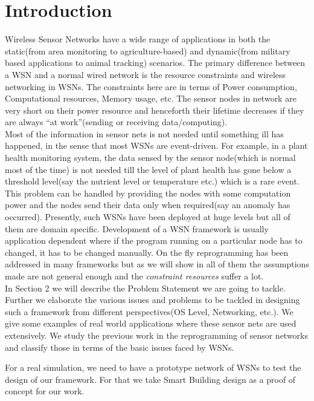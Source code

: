\documentclass[twocolumn]{article}
\begin{document}
\section{Introduction}
Wireless Sensor Networks have a wide range of applications in both the static(from area monitoring to agriculture-based) and dynamic(from military based applications to animal tracking) scenarios. The primary difference between a WSN and a normal wired network is the resource constraints and wireless networking in WSNs. The constraints here are in terms of Power consumption, Computational resources, Memory usage, etc. The sensor nodes in network are very short on their power resource and henceforth their lifetime decreases if they are always ``at work''(sending or receiving data/computing).\\
Most of the information in sensor nets is not needed until something ill has happened, in the sense that most WSNs are event-driven. For example, in a plant health monitoring system, the data sensed by the sensor node(which is normal most of the time) is not needed till the level of plant health has gone below a threshold level(say the nutrient level or temperature etc.) which is a rare event. This problem can be handled by providing the nodes with some computation power and the nodes send their data only when required(say an anomaly has occurred).
Presently, such WSNs have been deployed at huge levels but all of them are domain specific. Development of a WSN framework is usually application dependent where if the program running on a particular node has to changed, it has to be changed manually. On the fly reprogramming has been addressed in many frameworks but as we will show in all of them the assumptions made are not general enough and the \emph{constraint resources} suffer a lot.\\
In Section 2 we will describe the Problem Statement we are going to tackle. Further we elaborate the various issues and problems to be tackled in designing such a framework from different perspectives(OS Level, Networking, etc.). We give some examples of real world applications where these sensor nets are used extensively. We study the previous work in the reprogramming of sensor networks and classify those in terms of the basic issues faced by WSNs.

For a real simulation, we need to have a prototype network of WSNs to test the design of our framework. For that we take Smart Building design as a proof of concept for our work.
\end{document}
